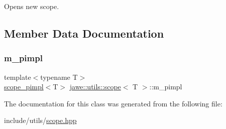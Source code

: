 Opens new scope. 

\subsection{Member Data Documentation}
\mbox{\label{classjawe_1_1utils_1_1scope_ae0aa866c7970de64388bc9ef1d835707}} 
\subsubsection{\texorpdfstring{m\+\_\+pimpl}{m\_pimpl}}
{\footnotesize\ttfamily template$<$typename T$>$ \\
\hyperlink{classjawe_1_1utils_1_1scope__pimpl}{scope\+\_\+pimpl}$<$T$>$ \hyperlink{classjawe_1_1utils_1_1scope}{jawe\+::utils\+::scope}$<$ T $>$\+::m\+\_\+pimpl\hspace{0.3cm}{\ttfamily [private]}}



The documentation for this class was generated from the following file\+:\begin{DoxyCompactItemize}
\item 
include/utils/\hyperlink{scope_8hpp}{scope.\+hpp}\end{DoxyCompactItemize}
